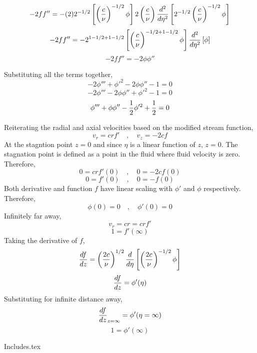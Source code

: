 \documentclass[a4paper, 12pt]{report}
\begin{document}
\begin{center}
$$-2ff'' = -(2)2^{-1/2}\left[\left(\frac{c}{\nu}\right)^{-1/2}\phi\right]2\left(\frac{c}{\nu}\right)\frac{d^2}{d\eta^2}\left[2^{-1/2}\left(\frac{c}{\nu}\right)^{-1/2}\phi\right]$$
$$-2ff'' = -2^{1-1/2+1-1/2}\left[\left(\frac{c}{\nu}\right)^{-1/2+1-1/2}\phi\right]\frac{d^2}{d\eta^2}\left[\phi\right]$$
$$-2ff'' = -2\phi\phi''$$

Substituting all the terms together,
$$-2\phi''' + \phi'^2 - 2\phi\phi'' - 1 = 0$$
$$-2\phi''' - 2\phi\phi'' + \phi'^2 - 1 = 0$$
$$\phi''' + \phi\phi'' - \frac{1}{2}\phi'^2 + \frac{1}{2} = 0$$

Reiterating the radial and axial velocities based on the modified stream function,
$$v_r =  crf' \quad,\quad v_z = -2cf$$
At the stagntion point $z=0$ and since $\eta$ is a linear function of $z$, $z=0$. The stagnation point is defined as a point in the fluid where fluid velocity is zero. Therefore,
$$0 =  crf'(0) \quad,\quad 0 = -2cf(0)$$
$$0 =  f'(0) \quad,\quad 0 = -f(0)$$
Both derivative and function $f$ have linear scaling with $\phi'$ and $\phi$ respectively. Therefore,
$$\phi(0)=0 \quad,\quad \phi'(0) = 0$$
Infinitely far away,
$$v_r = cr = crf'$$
$$1 = f'(\infty)$$
Taking the derivative of $f$,
$$\frac{df}{dz} = \left(\frac{2c}{\nu}\right)^{1/2}\frac{d}{d\eta}\left[\left(\frac{2c}{\nu}\right)^{-1/2}\phi\right]$$
$$\frac{df}{dz} = \phi'(\eta)$$
Substituting for infinite distance away,
$$\frac{df}{dz}_{z=\infty} = \phi'(\eta=\infty)$$
$$1 = \phi'(\infty)$$




{Includes.tex}


\end{center}
\end{document}
